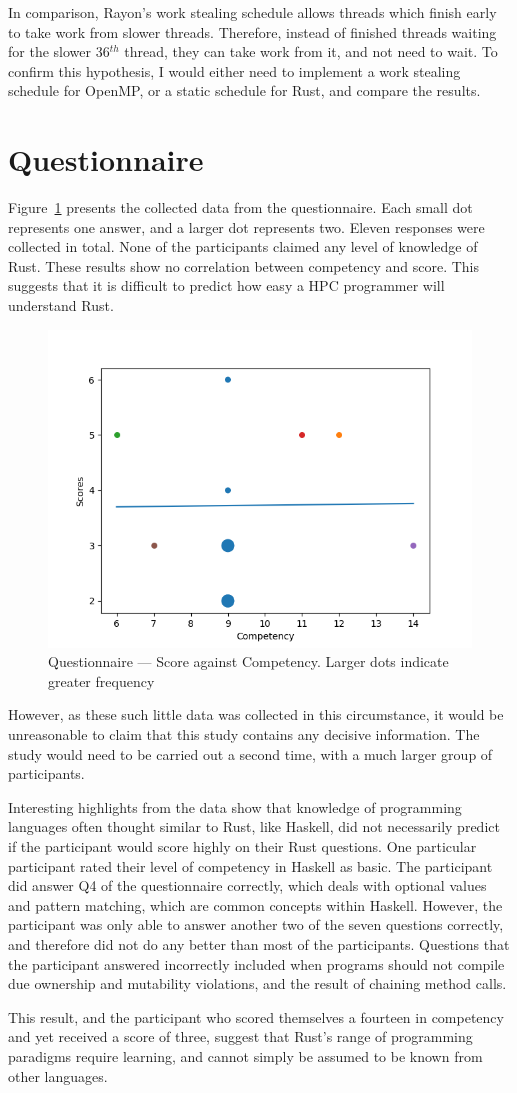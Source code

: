 In comparison, Rayon's work stealing schedule allows threads which finish early to take work from slower threads. Therefore, instead of finished threads waiting for the slower 36$^{th}$ thread, they can take work from it, and not need to wait. To confirm this hypothesis, I would either need to implement a work stealing schedule for OpenMP, or a static schedule for Rust, and compare the results.

\section{Questionnaire}\label{sec:res-q}
Figure~\ref{fig:questions} presents the collected data from the questionnaire. Each small dot represents one answer, and a larger dot represents two. Eleven responses were collected in total. None of the participants claimed any level of knowledge of Rust.
These results show no correlation between competency and score. This suggests that it is difficult to predict how easy a HPC programmer will understand Rust. 

\begin{figure}[h]
\centering
\includegraphics[width=.8\linewidth]{figs/questions/scatter.png}
\caption[Questionnaire Results]{Questionnaire --- Score against Competency. Larger dots indicate greater frequency}\label{fig:questions}
\end{figure}

However, as these such little data was collected in this circumstance, it would be unreasonable to claim that this study contains any decisive information. The study would need to be carried out a second time, with a much larger group of participants.

Interesting highlights from the data show that knowledge of programming languages often thought similar to Rust, like Haskell, did not necessarily predict if the participant would score highly on their Rust questions. One particular participant rated their level of competency in Haskell as basic. The participant did answer Q4 of the questionnaire correctly, which deals with optional values and pattern matching, which are common concepts within Haskell. However, the participant was only able to answer another two of the seven questions correctly, and therefore did not do any better than most of the participants. Questions that the participant answered incorrectly included when programs should not compile due ownership and mutability violations, and the result of chaining method calls.

This result, and the participant who scored themselves a fourteen in competency and yet received a score of three, suggest that Rust's range of programming paradigms require learning, and cannot simply be assumed to be known from other languages.
